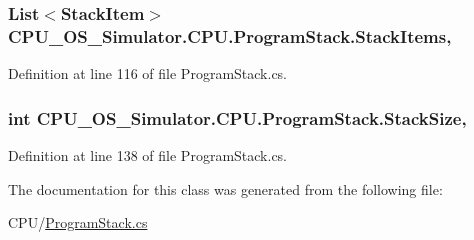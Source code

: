 \hypertarget{class_c_p_u___o_s___simulator_1_1_c_p_u_1_1_program_stack_a13eb0a485bbcdba8a38bbf80e78692c7}{}
\subsubsection[{Stack\+Items}]{\setlength{\rightskip}{0pt plus 5cm}List$<${\bf Stack\+Item}$>$ C\+P\+U\+\_\+\+O\+S\+\_\+\+Simulator.\+C\+P\+U.\+Program\+Stack.\+Stack\+Items\hspace{0.3cm}{\ttfamily [get]}, {\ttfamily [set]}}\label{class_c_p_u___o_s___simulator_1_1_c_p_u_1_1_program_stack_a13eb0a485bbcdba8a38bbf80e78692c7}


Definition at line 116 of file Program\+Stack.\+cs.

\hypertarget{class_c_p_u___o_s___simulator_1_1_c_p_u_1_1_program_stack_ac9cedcbfdf26ffa757042280f21da367}{}
\subsubsection[{Stack\+Size}]{\setlength{\rightskip}{0pt plus 5cm}int C\+P\+U\+\_\+\+O\+S\+\_\+\+Simulator.\+C\+P\+U.\+Program\+Stack.\+Stack\+Size\hspace{0.3cm}{\ttfamily [get]}, {\ttfamily [set]}}\label{class_c_p_u___o_s___simulator_1_1_c_p_u_1_1_program_stack_ac9cedcbfdf26ffa757042280f21da367}


Definition at line 138 of file Program\+Stack.\+cs.



The documentation for this class was generated from the following file\+:\begin{DoxyCompactItemize}
\item 
C\+P\+U/\hyperlink{_program_stack_8cs}{Program\+Stack.\+cs}\end{DoxyCompactItemize}
